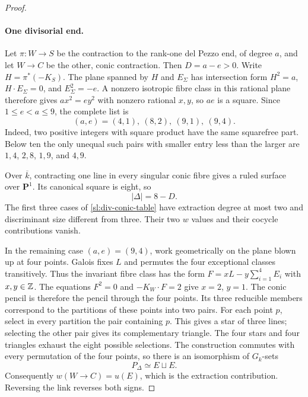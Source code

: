 \begin{proof}
\paragraph{One divisorial end.}
Let $\pi:W\to S$ be the contraction to the rank-one del Pezzo end,
of degree $a$, and let $W\to C$ be the other, conic contraction.
Then $D=a-e>0$.  Write
$H=\pi^*(-K_S)$.  The plane spanned by $H$ and $E_\Sigma$ has
intersection form $H^2=a$, $H\cdot E_\Sigma=0$, and
$E_\Sigma^2=-e$.  A nonzero isotropic fibre class in this rational
plane therefore gives $ax^2=ey^2$ with nonzero rational $x,y$, so
$ae$ is a square.  Since $1\leq e<a\leq9$, the
complete list is
\begin{equation}\label{sl:div-conic-table}
 (a,e)=(4,1),\ (8,2),\ (9,1),\ (9,4).
\end{equation}
Indeed, two positive integers with square product have the same
squarefree part.  Below ten the only unequal such pairs with smaller
entry less than the larger are $1,4$, $2,8$, $1,9$, and $4,9$.

Over $\overline k$, contracting one line in every singular conic fibre
gives a ruled surface over $\mathbf P^1$.  Its canonical square is eight,
so
\begin{equation}\label{sl:conic-size}
 |\Delta|=8-D.
\end{equation}
The first three cases of \eqref{sl:div-conic-table} have extraction
degree at most two and discriminant size different from three.  Their
two $w$ values and their cocycle contributions vanish.

In the remaining case $(a,e)=(9,4)$, work geometrically on the plane
blown up at four points.  Galois fixes $L$ and permutes the four
exceptional classes transitively.  Thus the invariant fibre class
has the form $F=xL-y\sum_{i=1}^4E_i$ with $x,y\in\mathbb Z$.  The equations
$F^2=0$ and $-K_W\cdot F=2$ give $x=2$, $y=1$.
The conic pencil is therefore the pencil through the four points.
Its three reducible members correspond to the partitions of these
points into two pairs.  For each point $p$, select in every partition
the pair containing $p$.  This gives a star of three lines; selecting
the other pair gives its complementary triangle.  The four stars
and four triangles exhaust the eight possible selections.  The
construction commutes with every permutation of the four points,
so there is an isomorphism of $G_k$-sets
\begin{equation}\label{sl:eight-orientations}
 P_\Delta\simeq E\sqcup E.
\end{equation}
Consequently $w(W\to C)=u(E)$, which is the extraction contribution.
Reversing the link reverses both signs.


\end{proof}
